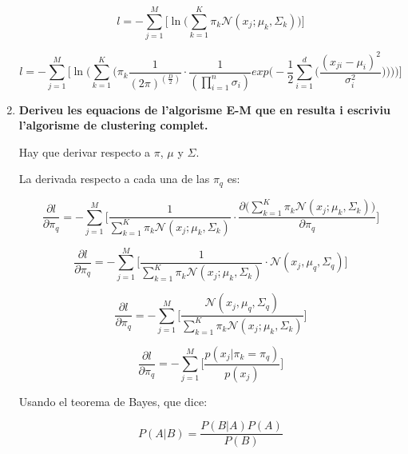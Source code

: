\documentclass[a5paper]{article}
\begin{document}
\begin{enumerate}
\begin{equation*}
l = -\sum_{j = 1}^{M} \Bigg[ 
\ln\Big(
\sum_{k = 1}^{K} \pi_k \mathcal{N}(x_j; \mu_k, \Sigma_k)
\Big)
\Bigg] 
\end{equation*}


\begin{equation*}
l = -\sum_{j = 1}^{M} \Bigg[ 
\ln\Big(
\sum_{k = 1}^{K}
\big(
    \pi_k \frac{1}{(2\pi)^{(\frac{D}{2})}} \cdot \frac{1}{(\prod_{i = 1}^n \sigma_i)} exp\Bigg( -\frac{1}{2} \sum_{i = 1}^{d} \Big( \frac{(x_{ji} - \mu_i)^2}{\sigma_i^2} \Big) \Bigg)
\big)
\Big)
\Bigg] 
\end{equation*}

\item \textbf{Deriveu les equacions de l'algorisme E-M que en resulta i escriviu l'algorisme de clustering complet.
}

Hay que derivar respecto a $\pi$, $\mu$ y $\Sigma$.

La derivada respecto a cada una de las $\pi_q$ es:

\begin{equation*}
\frac{\partial l}{\partial \pi_q} = 
-\sum_{j = 1}^{M} \Bigg[ 
\frac{1}{
\sum_{k = 1}^{K} \pi_k \mathcal{N}(x_j; \mu_k, \Sigma_k)
}
\cdot \frac{\partial \Big( 
\sum_{k = 1}^{K} \pi_k \mathcal{N}(x_j; \mu_k, \Sigma_k)
\Big)}{\partial \pi_q}
\Bigg] 
\end{equation*}

\begin{equation*}
\frac{\partial l}{\partial \pi_q} = 
-\sum_{j = 1}^{M} \Bigg[ 
\frac{1}{
\sum_{k = 1}^{K} \pi_k \mathcal{N}(x_j; \mu_k, \Sigma_k)
}
\cdot \mathcal{N}(x_j, \mu_q, \Sigma_q)
\Bigg] 
\end{equation*}


\begin{equation*}
\frac{\partial l}{\partial \pi_q} = 
-\sum_{j = 1}^{M} \Bigg[ 
\frac
{\mathcal{N}(x_j, \mu_q, \Sigma_q)}
{
\sum_{k = 1}^{K} \pi_k \mathcal{N}(x_j; \mu_k, \Sigma_k)
}
\Bigg] 
\end{equation*}

\begin{equation*}
\frac{\partial l}{\partial \pi_q} = 
-\sum_{j = 1}^{M} \Bigg[ 
\frac
{p(x_j | \pi_k = \pi_q)}
{
p(x_j)
}
\Bigg] 
\end{equation*}

Usando el teorema de Bayes, que dice:

\begin{equation*}
P(A|B) = \frac{P(B|A)P(A)}{P(B)}
\end{equation*}


\end{enumerate}
\end{document}
